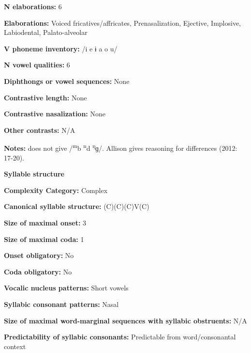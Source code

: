 \textbf{N elaborations:} 6



\textbf{Elaborations:} Voiced fricatives/affricates, Prenasalization, Ejective, Implosive, Labiodental, Palato-alveolar



\textbf{V phoneme inventory:} /i e ɨ a o u/



\textbf{N vowel qualities:} 6



\textbf{Diphthongs or vowel sequences:} None



\textbf{Contrastive length:} None



\textbf{Contrastive nasalization:} None



\textbf{Other contrasts:} N/A



\textbf{Notes:} \citet{Mahamat2005} does not give /\textsuperscript{m}b \textsuperscript{n}d \textsuperscript{ŋ}ɡ/. Allison gives reasoning for differences (2012: 17-20).



\textbf{Syllable structure}



\textbf{Complexity Category:} Complex



\textbf{Canonical syllable structure:} (C)(C)(C)V(C) \citep[23-24]{Allison2012}



\textbf{Size of maximal onset:} 3



\textbf{Size of maximal coda:} 1



\textbf{Onset obligatory:} No



\textbf{Coda obligatory:} No



\textbf{Vocalic nucleus patterns:} Short vowels



\textbf{Syllabic consonant patterns:} Nasal



\textbf{Size of maximal word{}-marginal sequences with syllabic obstruents:} N/A



\textbf{Predictability of syllabic consonants:} Predictable from word/consonantal context



